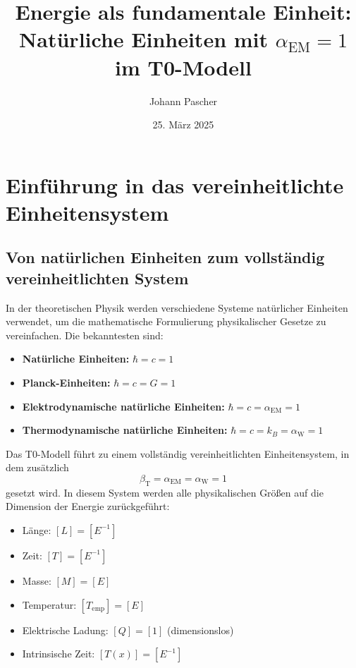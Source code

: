 \documentclass[12pt,a4paper]{article}
\newcommand{\Tfield}{T(x)}
\newcommand{\betaT}{\beta_{\text{T}}}
\newcommand{\alphaEM}{\alpha_{\text{EM}}}
\newcommand{\alphaW}{\alpha_{\text{W}}}
\begin{document}
	
	\title{Energie als fundamentale Einheit: \\ Natürliche Einheiten mit \(\alphaEM = 1\) im T0-Modell}
	\author{Johann Pascher}
	\date{25. März 2025}
	
	\maketitle
	\tableofcontents
	\newpage
	
	\section{Einführung in das vereinheitlichte Einheitensystem}
	
	\subsection{Von natürlichen Einheiten zum vollständig vereinheitlichten System}
	
	In der theoretischen Physik werden verschiedene Systeme natürlicher Einheiten verwendet, um die mathematische Formulierung physikalischer Gesetze zu vereinfachen. Die bekanntesten sind:
	
	\begin{itemize}
		\item \textbf{Natürliche Einheiten:} $\hbar = c = 1$ 
		\item \textbf{Planck-Einheiten:} $\hbar = c = G = 1$
		\item \textbf{Elektrodynamische natürliche Einheiten:} $\hbar = c = \alphaEM = 1$
		\item \textbf{Thermodynamische natürliche Einheiten:} $\hbar = c = k_B = \alphaW = 1$
	\end{itemize}
	
	Das T0-Modell führt zu einem vollständig vereinheitlichten Einheitensystem, in dem zusätzlich
	\begin{equation}
		\betaT = \alphaEM = \alphaW = 1
	\end{equation}
	gesetzt wird. In diesem System werden alle physikalischen Größen auf die Dimension der Energie zurückgeführt:
	
	\begin{tcolorbox}[colback=blue!5!white,colframe=blue!75!black,title=Dimensionen im vereinheitlichten Einheitensystem]
		\begin{itemize}
			\item Länge: $[L] = [E^{-1}]$
			\item Zeit: $[T] = [E^{-1}]$
			\item Masse: $[M] = [E]$
			\item Temperatur: $[T_{\text{emp}}] = [E]$
			\item Elektrische Ladung: $[Q] = [1]$ (dimensionslos)
			\item Intrinsische Zeit: $[\Tfield] = [E^{-1}]$
		\end{itemize}
	\end{tcolorbox}
	
\end{document}
